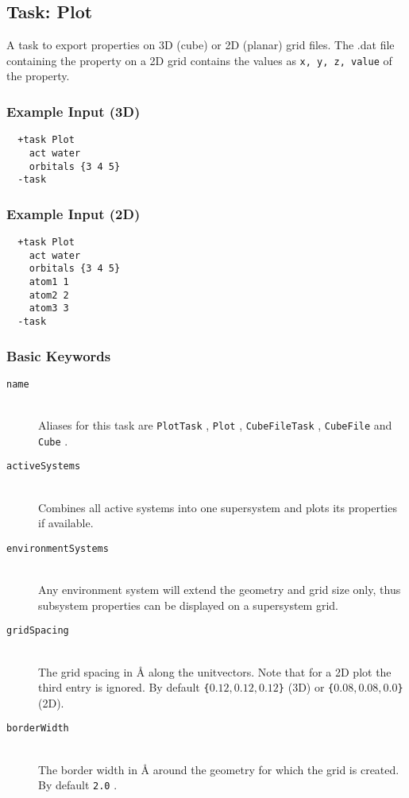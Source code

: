 \documentclass[bibliography=totocnumbered,a4paper,10pt,oneside]{scrbook}
\newcommand{\ttt}[1]{%
  \begingroup\setlength{\fboxsep}{1pt}%
  \colorbox{serenity-green!30}{\texttt{\hspace*{2pt}\vphantom{(g}#1\hspace*{2pt}}}%
  \endgroup
}
\begin{document}
\subsection{Task: Plot}
A task to export properties on 3D (cube) or 2D (planar) grid files. The .dat file containing the property on
a 2D grid contains the values as \ttt{x, y, z, value} of the property.

\subsubsection{Example Input (3D)}
\begin{lstlisting}
  +task Plot
    act water
    orbitals {3 4 5}
  -task
\end{lstlisting}

\subsubsection{Example Input (2D)}
\begin{lstlisting}
  +task Plot
    act water
    orbitals {3 4 5}
    atom1 1
    atom2 2
    atom3 3
  -task
\end{lstlisting}

\subsubsection{Basic Keywords}
\begin{description}
   \item [\texttt{name}]\hfill \\
  Aliases for this task are \ttt{PlotTask}, \ttt{Plot}, \ttt{CubeFileTask}, \ttt{CubeFile} and \ttt{Cube}.
   \item [\texttt{activeSystems}]\hfill \\
    Combines all active systems into one supersystem and plots its properties
    if available.
   \item [\texttt{environmentSystems}]\hfill \\
    Any environment system will extend the geometry and grid size
    only, thus subsystem properties can be displayed on a supersystem grid.
    \item [\texttt{gridSpacing}]\hfill \\
    The grid spacing in \AA{} along the unitvectors. Note that for a 2D plot the third entry is
    ignored. By default \ttt{\{$0.12, 0.12, 0.12$\}} (3D) or \ttt{\{$0.08, 0.08, 0.0$\}} (2D).
    \item [\texttt{borderWidth}]\hfill \\
    The border width in \AA{} around the geometry for which the grid is created. By default \ttt{2.0}.
\end{description}
\end{document}
